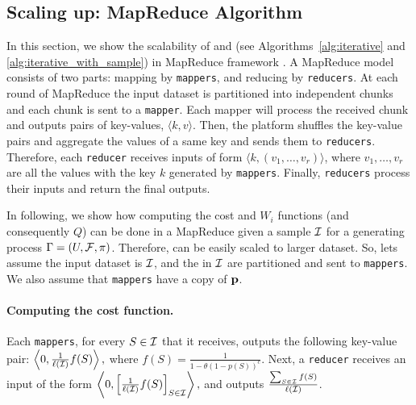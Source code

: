 \subsection{Scaling up: MapReduce Algorithm} 
In this section, we show the scalability of {\optimizer} and {\appoptimizer} (see Algorithms~\ref{alg:iterative} and \ref{alg:iterative_with_sample}) in MapReduce framework \cite{dean2008mapreduce}. A MapReduce model consists of two parts: mapping by \texttt{mappers}, and reducing by \texttt{reducers}. At each round of MapReduce the input dataset is partitioned into independent chunks and each chunk is sent to a \texttt{mapper}. Each mapper will process the received chunk and outputs pairs of key-values, $\langle k, v \rangle$. Then, the  platform shuffles the key-value pairs and aggregate the values of a same key and sends them to \texttt{reducers}. Therefore, each \texttt{reducer} receives inputs of form $\langle k, (v_1, \ldots, v_r) \rangle$, where $v_1, \ldots, v_r$ are all the values with the key $k$ generated by \texttt{mappers}. Finally, \texttt{reducers} process their inputs and return the final outputs.

In following, we show how computing the cost and $W_i$ functions (and consequently $Q$)  can be done in a MapReduce given a sample $\S$ for a generating process $\sys=(U,\F,\pi)$. Therefore, {\appoptimizer} can be easily scaled to larger dataset.
So, lets assume the input dataset is $\S$, and the {\ins} in $\S$ are partitioned and sent to \texttt{mappers}. We also assume that \texttt{mappers} have a copy of $\p$. 


\paragraph{\bf Computing the cost function.}
Each \texttt{mappers}, for every $S\in \S$ that it receives, outputs the following key-value pair:
$\left\langle 0,  \frac{1}{\ell(\S)}f(S) \right\rangle,$
where $f(S) = \frac{1}{1- \theta(1-p(S))^c}$.
Next, a \texttt{reducer} receives an input of the form 
$\left\langle 0,  \left[\frac{1}{\ell(\S)}f(S)\right]_{S\in \S}  \right\rangle,$
and outputs $\frac{\sum_{S\in \S}f(S)}{\ell(\S)}$.

